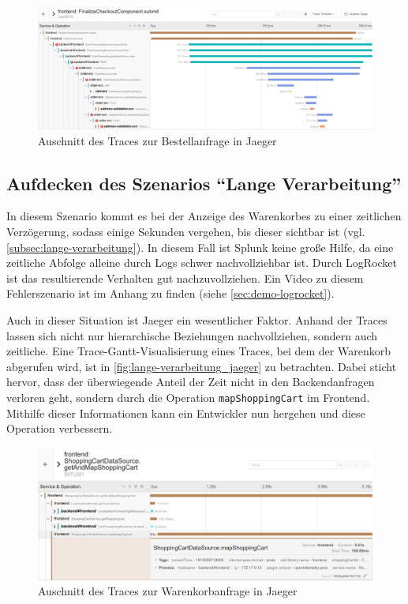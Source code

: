\begin{figure}[H]
	\centering
	\includegraphics[width=1.00\linewidth]{img/05_ergebnis/ungueltige-adressen-sind-gueltig_jaeger-detail.png}
	\caption{Auschnitt des Traces zur Bestellanfrage in Jaeger}
	\label{fig:ungueltige-adressen-sind-gueltig_jaeger-detail}
\end{figure}

\subsection{Aufdecken des Szenarios \enquote{Lange Verarbeitung}}

In diesem Szenario kommt es bei der Anzeige des Warenkorbes zu einer zeitlichen Verzögerung, sodass einige Sekunden vergehen, bis dieser sichtbar ist (vgl. \autoref{subsec:lange-verarbeitung}). In diesem Fall ist Splunk keine große Hilfe, da eine zeitliche Abfolge alleine durch Logs schwer nachvollziehbar ist. Durch LogRocket ist das resultierende Verhalten gut nachzuvollziehen. Ein Video zu diesem Fehlerszenario ist im Anhang zu finden (siehe \autoref{sec:demo-logrocket}).

Auch in dieser Situation ist Jaeger ein wesentlicher Faktor. Anhand der Traces lassen sich nicht nur hierarchische Beziehungen nachvollziehen, sondern auch zeitliche. Eine Trace-Gantt-Visualisierung eines Traces, bei dem der Warenkorb abgerufen wird, ist in \autoref{fig:lange-verarbeitung_jaeger} zu betrachten. Dabei sticht hervor, dass der überwiegende Anteil der Zeit nicht in den Backendanfragen verloren geht, sondern durch die Operation \texttt{mapShoppingCart} im Frontend. Mithilfe dieser Informationen kann ein Entwickler nun hergehen und diese Operation verbessern.

\begin{figure}[H]
	\centering
	\includegraphics[width=1.00\linewidth]{img/05_ergebnis/lange-verarbeitung_jaeger.png}
	\caption{Auschnitt des Traces zur Warenkorbanfrage in Jaeger}
	\label{fig:lange-verarbeitung_jaeger}
\end{figure}